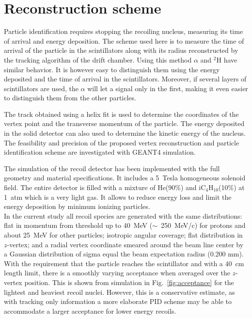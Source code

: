 \section{Reconstruction scheme} \label{sec:sim}

Particle identification requires stopping the recoiling nucleus, measuring its time of arrival and energy deposition. The scheme used here is to measure the time of arrival of the particle in the scintillators along with its radius reconstructed by the tracking algorithm of the drift chamber. Using this method $\alpha$ and $^2$H have similar behavior. It is however easy to distinguish them using the energy deposited and the time of arrival in the scintillators. Moreover, if several layers of scintillators are used, the $\alpha$ will let a signal only in the first, making it even easier to distinguish them from the other particles. 

The track obtained using a helix fit is used to determine the coordinates of the vertex point and the transverse momentum of the particle. The energy deposited in the solid detector can also used to determine the kinetic energy of the nucleus. The feasibility and precision of the proposed vertex reconstruction and particle identification scheme are investigated with GEANT4 simulation.

The simulation of the recoil detector has been implemented with the full geometry and material specifications. It includes a 5~Tesla homogeneous solenoid field. The entire detector is filled with a mixture of He(90\%) and iC$_4$H$_{10}$(10\%) at 1~atm which is a very light gas. It allows to reduce energy loss and limit the energy deposition by minimum ionizing particles.  \\

In the current study all recoil species are generated with the same distributions: flat in momentum from threshold up to 40~MeV ($\sim$~250~MeV/c) for protons and about 25~MeV for other particles; isotropic angular coverage; flat distribution in $z$-vertex; and a radial vertex coordinate smeared around the beam line center by a Gaussian distribution of sigma equal the beam expectation radius (0.200 mm). \\

With the requirement that the particle reaches the scintillator and with a 40~cm length limit, there is a smoothly varying acceptance when averaged over the $z$-vertex position. This is shown from simulation in Fig.~\ref{fig:acceptance} for the lightest and heaviest recoil nuclei. However, this is a conservative estimate, as with tracking only information a more elaborate PID scheme may be able to accommodate a larger acceptance for lower energy recoils.\\

